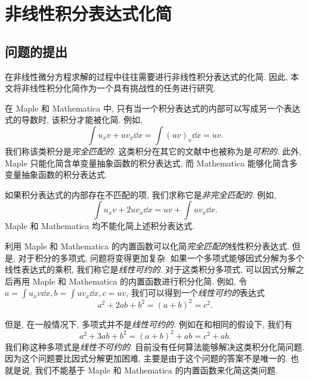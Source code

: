\chapter{非线性积分表达式化简}\label{ch06}
\section{问题的提出}
在非线性微分方程求解的过程中往往需要进行非线性积分表达式的化简. 因此, 本文将非线性积分化简作为一个具有挑战性的任务进行研究.

在 Maple 和 Mathematica 中, 只有当一个积分表达式的内部可以写成另一个表达式的导数时, 该积分才能被化简. 例如, 
\begin{equation}
\int\!{u_xv+uv_x \dd x}=\int\!{(uv)_x\dd x}=uv.
\label{complete_matched}
\end{equation}
我们称该类积分是\emph{完全匹配的}. 这类积分在其它的文献中也被称为是\emph{可积的}. 此外, Maple 只能化简含单变量抽象函数的积分表达式, 而 Mathematica 能够化简含多变量抽象函数的积分表达式. 

如果积分表达式的内部存在不匹配的项, 我们求称它是\emph{非完全匹配的}. 例如,
\begin{equation}
\int\!{u_xv+2uv_x \dd x}=uv+\int\!{uv_x\dd x}.
\label{incomplete_matched}
\end{equation}
Maple 和 Mathematica 均不能化简上述积分表达式. 

利用 Maple 和 Mathematica 的内置函数可以化简\emph{完全匹配的}线性积分表达式. 但是, 对于积分的多项式, 问题将变得更加复杂. 如果一个多项式能够因式分解为多个线性表达式的乘积, 我们称它是\emph{线性可约的}. 对于这类积分多项式, 可以因式分解之后再用 Maple 和 Mathematica 的内置函数进行积分化简. 例如, 令$a=\int{u_x v \dd x},b=\int{u v_x \dd x},c=uv$, 我们可以得到一个\emph{线性可约的}表达式
\begin{equation}
a^2+2ab+b^2=(a+b)^2=c^2.
\label{liner_reducible}
\end{equation}

但是, 在一般情况下, 多项式并不是\emph{线性可约的}. 例如在和相同的假设下, 我们有
\begin{equation}
a^2+3ab+b^2=(a+b)^2+ab=c^2+ab.
\label{non_linear_reducible}
\end{equation} 
我们称这种多项式是\emph{线性不可约的}. 目前没有任何算法能够解决这类积分化简问题. 因为这个问题要比因式分解更加困难, 主要是由于这个问题的答案不是唯一的. 也就是说, 我们不能基于 Maple 和 Mathematica 的内置函数来化简这类问题. 

